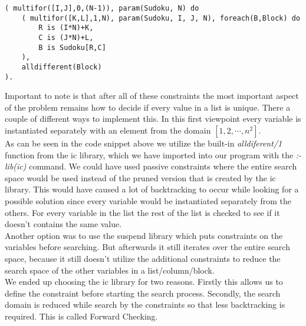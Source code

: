 \begin{lstlisting}
( multifor([I,J],0,(N-1)), param(Sudoku, N) do
	( multifor([K,L],1,N), param(Sudoku, I, J, N), foreach(B,Block) do
		R is (I*N)+K,
		C is (J*N)+L,
		B is Sudoku[R,C]
	),
	alldifferent(Block)
).
\end{lstlisting}

Important to note is that after all of these constraints the most important aspect of the problem remains how to decide if every value in a list is unique. 
There a couple of different ways to implement this.
In this first viewpoint every variable is instantiated separately with an element from the domain $[1,2,\cdots,n^{2}]$. \\

As can be seen in the code snippet above we utilize the built-in \textsl{alldiferent/1} function from the ic library, which we have imported into our program with the \textsl{:- lib(ic)} command.
We could have used passive constraints where the entire search space would be used instead of the pruned version that is created by the ic library.
This would have caused a lot of backtracking to occur while looking for a possible solution since every variable would be instantiated separately from the others.
For every variable in the list the rest of the list is checked to see if it doesn't contains the same value.\\

Another option was to use the suspend library which puts constraints on the variables before searching.
But afterwards it still iterates over the entire search space, because it still doesn't utilize the additional constraints to reduce the search space of the other variables in a list/column/block.\\

We ended up choosing the ic library for two reasons.
Firstly this allows us to define the constraint before starting the search process.
Secondly, the search domain is reduced while search by the constraints so that less backtracking is required.
This is called Forward Checking. \\

